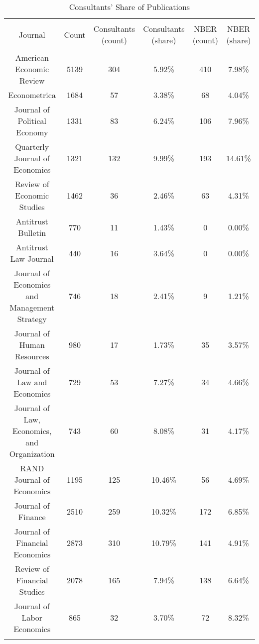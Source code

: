 
\begin{table}[!htbp] \centering 
  \caption{Consultants' Share of Publications} 
  \label{} 
\begin{tabular}{@{\extracolsep{5pt}} cccccc} 
\\[-1.8ex]\hline 
\hline \\[-1.8ex] 
Journal & Count & Consultants (count) & Consultants (share) & NBER (count) & NBER (share) \\ 
\hline \\[-1.8ex] 
American Economic Review & 5139 & 304 & 5.92\% & 410 & 7.98\% \\ 
Econometrica & 1684 & 57 & 3.38\% & 68 & 4.04\% \\ 
Journal of Political Economy & 1331 & 83 & 6.24\% & 106 & 7.96\% \\ 
Quarterly Journal of Economics & 1321 & 132 & 9.99\% & 193 & 14.61\% \\ 
Review of Economic Studies & 1462 & 36 & 2.46\% & 63 & 4.31\% \\ 
Antitrust Bulletin & 770 & 11 & 1.43\% & 0 & 0.00\% \\ 
Antitrust Law Journal & 440 & 16 & 3.64\% & 0 & 0.00\% \\ 
Journal of Economics and Management Strategy & 746 & 18 & 2.41\% & 9 & 1.21\% \\ 
Journal of Human Resources & 980 & 17 & 1.73\% & 35 & 3.57\% \\ 
Journal of Law and Economics & 729 & 53 & 7.27\% & 34 & 4.66\% \\ 
Journal of Law, Economics, and Organization & 743 & 60 & 8.08\% & 31 & 4.17\% \\ 
RAND Journal of Economics & 1195 & 125 & 10.46\% & 56 & 4.69\% \\ 
Journal of Finance & 2510 & 259 & 10.32\% & 172 & 6.85\% \\ 
Journal of Financial Economics & 2873 & 310 & 10.79\% & 141 & 4.91\% \\ 
Review of Financial Studies & 2078 & 165 & 7.94\% & 138 & 6.64\% \\ 
Journal of Labor Economics & 865 & 32 & 3.70\% & 72 & 8.32\% \\ 
\hline \\[-1.8ex] 
\end{tabular} 
\end{table} 
